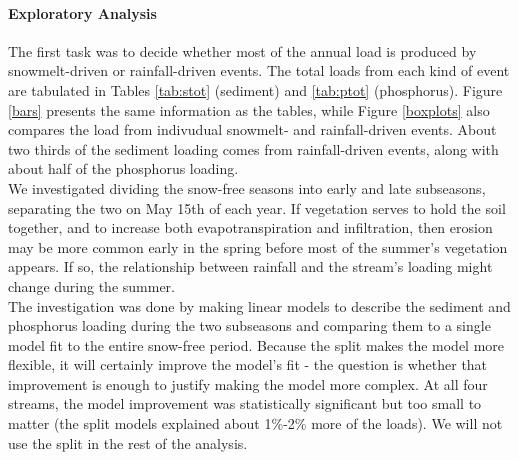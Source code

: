 \documentclass[10pt]{article}
\begin{document}
\paragraph{Exploratory Analysis}
The first task was to decide whether most of the annual load is produced by snowmelt-driven or rainfall-driven events. The total loads from each kind of event are tabulated in Tables \ref{tab:stot} (sediment) and \ref{tab:ptot} (phosphorus). Figure \ref{bars} presents the same information as the tables, while Figure \ref{boxplots} also compares the load from indivudual snowmelt- and rainfall-driven events. About two thirds of the sediment loading comes from rainfall-driven events, along with about half of the phosphorus loading.\\

We investigated dividing the snow-free seasons into early and late subseasons, separating the two on May 15th of each year. If vegetation serves to hold the soil together, and to increase both evapotranspiration and infiltration, then erosion may be more common early in the spring before most of the summer's vegetation appears. If so, the relationship between rainfall and the stream's loading might change during the summer.\\

The investigation was done by making linear models to describe the sediment and phosphorus loading during the two subseasons and comparing them to a single model fit to the entire snow-free period. Because the split makes the model more flexible, it will certainly improve the model's fit - the question is whether that improvement is enough to justify making the model more complex. At all four streams, the model improvement was statistically significant but too small to matter (the split models explained about 1\%-2\% more of the loads). We will not use the split in the rest of the analysis.\\
\end{document}
